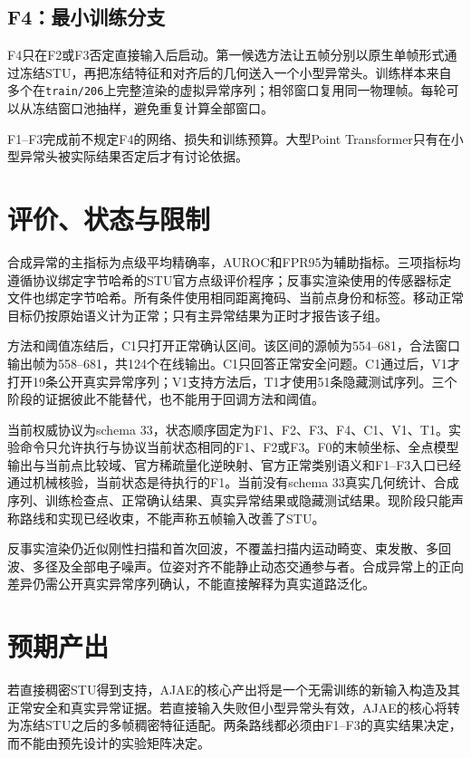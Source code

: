 \documentclass[UTF8,a4paper,zihao=5,fontset=none]{ctexart}
\begin{document}
\subsection{F4：最小训练分支}

F4只在F2或F3否定直接输入后启动。第一候选方法让五帧分别以原生单帧形式通过冻结STU，再把冻结特征和对齐后的几何送入一个小型异常头。训练样本来自多个在\texttt{train/206}上完整渲染的虚拟异常序列；相邻窗口复用同一物理帧。每轮可以从冻结窗口池抽样，避免重复计算全部窗口。

F1--F3完成前不规定F4的网络、损失和训练预算。大型Point Transformer只有在小型异常头被实际结果否定后才有讨论依据。

\section{评价、状态与限制}

合成异常的主指标为点级平均精确率，AUROC和FPR95为辅助指标。三项指标均遵循协议绑定字节哈希的STU官方点级评价程序；反事实渲染使用的传感器标定文件也绑定字节哈希。所有条件使用相同距离掩码、当前点身份和标签。移动正常目标仍按原始语义计为正常；只有主异常结果为正时才报告该子组。

方法和阈值冻结后，C1只打开正常确认区间。该区间的源帧为554--681，合法窗口输出帧为558--681，共124个在线输出。C1只回答正常安全问题。C1通过后，V1才打开19条公开真实异常序列；V1支持方法后，T1才使用51条隐藏测试序列。三个阶段的证据彼此不能替代，也不能用于回调方法和阈值。

当前权威协议为schema 33，状态顺序固定为F1、F2、F3、F4、C1、V1、T1。实验命令只允许执行与协议当前状态相同的F1、F2或F3。F0的末帧坐标、全点模型输出与当前点比较域、官方稀疏量化逆映射、官方正常类别语义和F1--F3入口已经通过机械核验，当前状态是待执行的F1。当前没有schema 33真实几何统计、合成序列、训练检查点、正常确认结果、真实异常结果或隐藏测试结果。现阶段只能声称路线和实现已经收束，不能声称五帧输入改善了STU。

反事实渲染仍近似刚性扫描和首次回波，不覆盖扫描内运动畸变、束发散、多回波、多径及全部电子噪声。位姿对齐不能静止动态交通参与者。合成异常上的正向差异仍需公开真实异常序列确认，不能直接解释为真实道路泛化。

\section{预期产出}

若直接稠密STU得到支持，AJAE的核心产出将是一个无需训练的新输入构造及其正常安全和真实异常证据。若直接输入失败但小型异常头有效，AJAE的核心将转为冻结STU之后的多帧稠密特征适配。两条路线都必须由F1--F3的真实结果决定，而不能由预先设计的实验矩阵决定。
\end{document}
